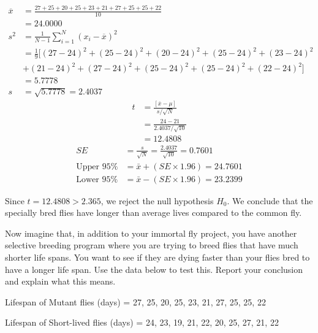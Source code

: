 \documentclass[onecolumn,10pt]{jhwhw}
\begin{document}
\begin{equation*}
\begin{split}
\overline{x} & = \frac{27 + 25 + 20 + 25 + 23 + 21 + 27 + 25 + 25 + 22}{10} \\
             & = 24.0000 \\
s^2 & = \frac{1}{N-1} \sum_{i=1}^N (x_i - \overline{x})^2 \\
    & = \frac{1}{9} [(27-24)^2 + (25-24)^2 + (20-24)^2 + (25-24)^2 + (23-24)^2 \\
    & + (21-24)^2 + (27-24)^2 + (25-24)^2 + (25-24)^2 + (22-24)^2] \\
    & = 5.7778 \\
s & = \sqrt{5.7778} = 2.4037
\end{split}
\end{equation*}
\begin{equation*}
\begin{split}
t & = \frac{\left[ \overline{x} - \mu \right]}{s/\sqrt{N}} \\
  & = \frac{24 - 21}{2.4037/\sqrt{10}} \\
  & = 12.4808
\end{split}
\end{equation*}
\begin{equation*}
\begin{split}
SE & = \frac{s}{\sqrt{N}} = \frac{2.4037}{\sqrt{10}} = 0.7601 \\
\text{Upper 95\%} & = \bar{x} + (SE \times 1.96) = 24.7601 \\
\text{Lower 95\%} & = \bar{x} - (SE \times 1.96) = 23.2399
\end{split}
\end{equation*}

Since $t = 12.4808 > 2.365$, we reject the null hypothesis $H_0$. We conclude that the specially bred flies have longer than average lives compared to the common fly.

\problem{}
Now imagine that, in addition to your immortal fly project, you have another selective breeding program where you are trying to breed flies that have much shorter life spans. You want to see if they are dying faster than your flies bred to have a longer life span. Use the data below to test this. Report your conclusion and explain what this means.

Lifespan of Mutant flies (days) = {27, 25, 20, 25, 23, 21, 27, 25, 25, 22}

Lifespan of Short-lived flies (days) = {24, 23, 19, 21, 22, 20, 25, 27, 21, 22}
\end{document}
